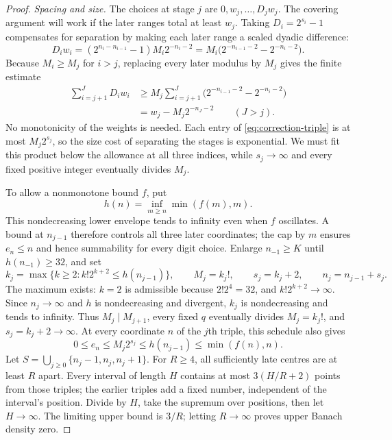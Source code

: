\documentclass[11pt]{article}
\begin{document}
\begin{proof}
\par\medskip\noindent\emph{Spacing and size.}
The choices at stage $j$ are $0,w_j,\ldots,D_jw_j$.
The covering argument will work if the later ranges total at least
$w_j$.  Taking $D_i=2^{s_i}-1$ compensates for separation by making
each later range a scaled dyadic difference:
\[
 D_iw_i=(2^{n_i-n_{i-1}}-1)M_i2^{-n_i-2}
       =M_i\bigl(2^{-n_{i-1}-2}-2^{-n_i-2}\bigr).
\]
Because $M_i\ge M_j$ for $i>j$, replacing every later modulus by $M_j$
gives the finite estimate
\begin{equation}\label{eq:finite-overlap}
 \begin{aligned}
 \sum_{i=j+1}^{J}D_iw_i
 &\ge M_j\sum_{i=j+1}^{J}
       \bigl(2^{-n_{i-1}-2}-2^{-n_i-2}\bigr)\\
 &=w_j-M_j2^{-n_J-2}\qquad(J>j).
 \end{aligned}
\end{equation}
No monotonicity of the weights is needed.  Each entry of
\eqref{eq:correction-triple} is at most $M_j2^{s_j}$, so the size cost of
separating the stages is exponential.  We must fit this product below
the allowance at all three indices, while $s_j\to\infty$ and every
fixed positive integer eventually divides $M_j$.

To allow a nonmonotone bound $f$, put
\[
 h(n)=\inf_{m\ge n}\min(f(m),m).
\]
This nondecreasing lower envelope tends to infinity even when $f$
oscillates.  A bound at $n_{j-1}$ therefore controls all three later
coordinates; the cap by $m$ ensures $e_n\le n$ and hence summability
for every digit choice.
Enlarge $n_{-1}\ge K$ until $h(n_{-1})\ge32$, and set
\[
 k_j=\max\{k\ge2:k!2^{k+2}\le h(n_{j-1})\},\qquad
 M_j=k_j!,\qquad s_j=k_j+2,\qquad n_j=n_{j-1}+s_j.
\]
The maximum exists: $k=2$ is admissible because $2!2^4=32$, and
$k!2^{k+2}\to\infty$.  Since $n_j\to\infty$ and $h$ is nondecreasing
and divergent, $k_j$ is nondecreasing and tends to infinity.  Thus
$M_j\mid M_{j+1}$, every fixed $q$ eventually divides $M_j=k_j!$,
and $s_j=k_j+2\to\infty$.
At every coordinate $n$ of the $j$th triple, this schedule also gives
\[
 0\le e_n\le M_j2^{s_j}\le h(n_{j-1})\le\min(f(n),n).
\]
Let $S=\bigcup_{j\ge0}\{n_j-1,n_j,n_j+1\}$.  For $R\ge4$, all
sufficiently late centres are at least $R$ apart.  Every interval of
length $H$ contains at most $3(H/R+2)$ points from those triples;
the earlier triples add a fixed number, independent of the interval's
position.  Divide by $H$, take the supremum over positions, then let
$H\to\infty$.  The limiting upper bound is $3/R$; letting $R\to\infty$
proves upper Banach density zero.


\end{proof}
\end{document}
